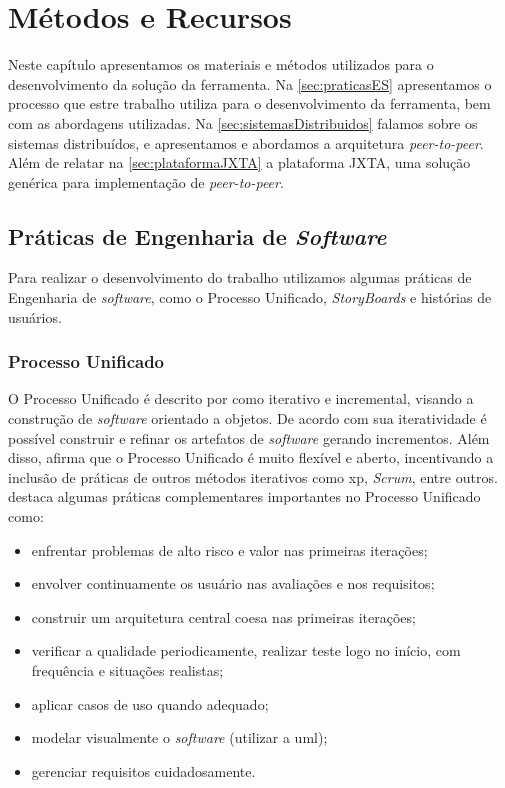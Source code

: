 \chapter{Métodos e Recursos}\label{metodosRecursos}

Neste capítulo apresentamos os materiais e métodos utilizados para o desenvolvimento da solução da ferramenta. Na \autoref{sec:praticasES} apresentamos o processo que estre trabalho utiliza para o desenvolvimento da ferramenta, bem com as abordagens utilizadas. Na \autoref{sec:sistemasDistribuidos} falamos sobre os sistemas distribuídos, e apresentamos e abordamos a arquitetura \textit{peer-to-peer}. Além de relatar na \autoref{sec:plataformaJXTA} a plataforma JXTA, uma solução genérica para implementação de \textit{peer-to-peer}.

\section{Práticas de Engenharia de \textit{Software}}\label{sec:praticasES}
Para realizar o desenvolvimento do trabalho utilizamos algumas práticas de Engenharia de \textit{software}, como o Processo Unificado, \textit{StoryBoards} e histórias de usuários.

\subsection{Processo Unificado}\label{sub:processoUnificado}
O Processo Unificado é descrito por  como iterativo e incremental, visando a construção de \textit{software} orientado a objetos. De acordo com sua iteratividade é possível construir e refinar os artefatos de \textit{software} gerando incrementos. Além disso,  afirma que o Processo Unificado é muito flexível e aberto, incentivando a inclusão de práticas de outros métodos iterativos como \ac{xp}, \textit{Scrum}, entre outros.
 destaca algumas práticas complementares importantes no Processo Unificado como:
\begin{itemize}
	\item enfrentar problemas de alto risco e valor nas primeiras iterações;
	\item envolver continuamente os usuário nas avaliações e nos requisitos;
	\item construir um arquitetura central coesa nas primeiras iterações;
	\item verificar a qualidade periodicamente, realizar teste logo no início, com frequência e situações realistas;
	\item aplicar casos de uso quando adequado;
	\item modelar visualmente o \textit{software} (utilizar a \ac{uml});
	\item gerenciar requisitos cuidadosamente. 
\end{itemize}


